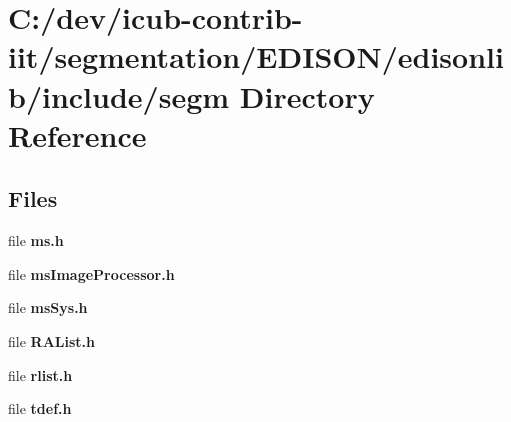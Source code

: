 \section{C\+:/dev/icub-\/contrib-\/iit/segmentation/\+E\+D\+I\+S\+O\+N/edisonlib/include/segm Directory Reference}
\label{dir_1369adde05bf5f0af967fe99b08d4c65}
\subsection*{Files}
\begin{DoxyCompactItemize}
\item 
file {\bfseries ms.\+h}
\item 
file {\bfseries ms\+Image\+Processor.\+h}
\item 
file {\bfseries ms\+Sys.\+h}
\item 
file {\bfseries R\+A\+List.\+h}
\item 
file {\bfseries rlist.\+h}
\item 
file {\bfseries tdef.\+h}
\end{DoxyCompactItemize}
